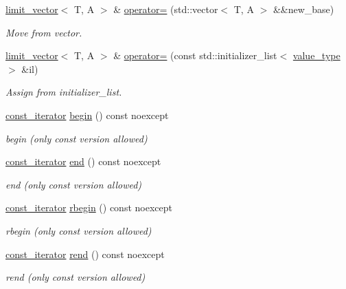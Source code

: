 \begin{DoxyCompactItemize}
\hyperlink{classIceBRG_1_1limit__vector}{limit\+\_\+vector}$<$ T, A $>$ \& \hyperlink{classIceBRG_1_1limit__vector_a28d7a79eb78abec3957e757ab2262532}{operator=} (std\+::vector$<$ T, A $>$ \&\&new\+\_\+base)
\begin{DoxyCompactList}\small\item\em Move from vector. \end{DoxyCompactList}\item 
\hyperlink{classIceBRG_1_1limit__vector}{limit\+\_\+vector}$<$ T, A $>$ \& \hyperlink{classIceBRG_1_1limit__vector_a23594cf6dd3e8e036c4bb3c7e5f02f8a}{operator=} (const std\+::initializer\+\_\+list$<$ \hyperlink{classIceBRG_1_1limit__vector_a9b1e2f022c18b0227b25bb571741bb28}{value\+\_\+type} $>$ \&il)
\begin{DoxyCompactList}\small\item\em Assign from initializer\+\_\+list. \end{DoxyCompactList}\item 
\hyperlink{classIceBRG_1_1limit__vector_ae7acd983de8fc074624eb50450a01e30}{const\+\_\+iterator} \hyperlink{classIceBRG_1_1limit__vector_ac777b677396a9e35f8c9e20c692c5ece}{begin} () const  noexcept
\begin{DoxyCompactList}\small\item\em begin (only const version allowed) \end{DoxyCompactList}\item 
\hyperlink{classIceBRG_1_1limit__vector_ae7acd983de8fc074624eb50450a01e30}{const\+\_\+iterator} \hyperlink{classIceBRG_1_1limit__vector_a83c8a935495a3b160331b34ab22fe3f5}{end} () const  noexcept
\begin{DoxyCompactList}\small\item\em end (only const version allowed) \end{DoxyCompactList}\item 
\hyperlink{classIceBRG_1_1limit__vector_ae7acd983de8fc074624eb50450a01e30}{const\+\_\+iterator} \hyperlink{classIceBRG_1_1limit__vector_af1d46879c772026fb810ddf95a574d8f}{rbegin} () const  noexcept
\begin{DoxyCompactList}\small\item\em rbegin (only const version allowed) \end{DoxyCompactList}\item 
\hyperlink{classIceBRG_1_1limit__vector_ae7acd983de8fc074624eb50450a01e30}{const\+\_\+iterator} \hyperlink{classIceBRG_1_1limit__vector_a16efe52b79ef8ca10a45b6a2706f2a62}{rend} () const  noexcept
\begin{DoxyCompactList}\small\item\em rend (only const version allowed) \end{DoxyCompactList}\item 

\end{DoxyCompactItemize}

